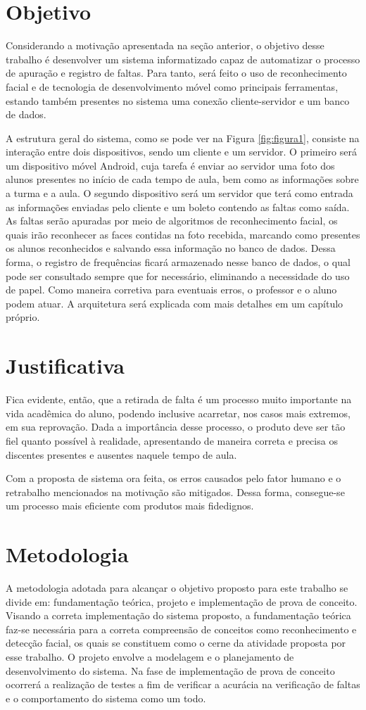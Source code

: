 \section{Objetivo}
Considerando a motivação apresentada na seção anterior, o objetivo desse trabalho é desenvolver um sistema informatizado capaz de automatizar o processo de apuração e registro de faltas. Para tanto, será feito o uso de reconhecimento facial e de tecnologia de desenvolvimento móvel como principais ferramentas, estando também presentes no sistema uma conexão cliente-servidor e um banco de dados.

A estrutura geral do sistema, como se pode ver na Figura \ref{fig:figura1}, consiste na interação entre dois dispositivos, sendo um cliente e um servidor. O primeiro será um dispositivo móvel Android, cuja tarefa é enviar ao servidor uma foto dos alunos presentes no início de cada tempo de aula, bem como as informações sobre a turma e a aula. O segundo dispositivo será um servidor que terá como entrada as informações enviadas pelo cliente e um boleto contendo as faltas como saída. As faltas serão apuradas por meio de algoritmos de reconhecimento facial, os quais irão reconhecer as faces contidas na foto recebida, marcando como presentes os alunos reconhecidos e salvando essa informação no banco de dados. Dessa forma, o registro de frequências ficará armazenado nesse banco de dados, o qual pode ser consultado sempre que for necessário, eliminando a necessidade do uso de papel. Como maneira corretiva para eventuais erros, o professor e o aluno podem atuar. A arquitetura será explicada com mais detalhes em um capítulo próprio.
\section{Justificativa}
Fica evidente, então, que a retirada de falta é um processo muito importante na vida acadêmica do aluno, podendo inclusive acarretar, nos casos mais extremos, em sua reprovação. Dada a importância desse processo, o produto deve ser tão fiel quanto possível à realidade, apresentando de maneira correta e precisa os discentes presentes e ausentes naquele tempo de aula.

Com a proposta de sistema ora feita, os erros causados pelo fator humano e o retrabalho mencionados na motivação são mitigados. Dessa forma, consegue-se um processo mais eficiente com produtos mais fidedignos. 

\section{Metodologia}
A metodologia adotada para alcançar o objetivo proposto para este trabalho se divide em: fundamentação teórica, projeto e implementação de prova de conceito. Visando a correta implementação do sistema proposto, a fundamentação teórica faz-se necessária para a correta compreensão de conceitos como reconhecimento e detecção facial, os quais se constituem como o cerne da atividade proposta por esse trabalho. O projeto envolve a modelagem e o planejamento de desenvolvimento do sistema.  Na fase de implementação de prova de conceito ocorrerá a realização de testes a fim de verificar a acurácia na verificação de faltas e o comportamento do sistema como um todo. 

